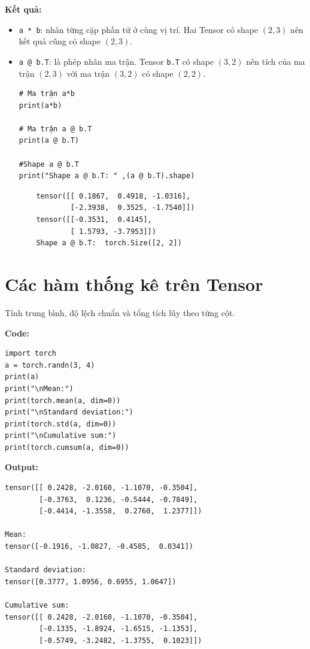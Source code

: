 \documentclass[12pt,a4paper]{article}
\begin{document}
\textbf{Kết quả:}
\begin{itemize}
    \item \texttt{a * b}: nhân từng cặp phần tử ở cùng vị trí. Hai Tensor có shape $(2,3)$ nên kết quả cũng có shape $(2,3)$.
    \item \texttt{a @ b.T}: là phép nhân ma trận. Tensor \texttt{b.T} có shape $(3,2)$ nên tích của ma trận $(2,3)$ với ma trận $(3,2)$ có shape $(2,2)$.

\begin{verbatim}
# Ma trận a*b
print(a*b)

# Ma trận a @ b.T
print(a @ b.T)

#Shape a @ b.T
print("Shape a @ b.T: " ,(a @ b.T).shape)
    \end{verbatim}

    \begin{verbatim}
    tensor([[ 0.1867,  0.4918, -1.0316],
            [-2.3938,  0.3525, -1.7540]])
    tensor([[-0.3531,  0.4145],
            [ 1.5793, -3.7953]])
    Shape a @ b.T:  torch.Size([2, 2])
    \end{verbatim}
\end{itemize}


    

\section{Các hàm thống kê trên Tensor}
Tính trung bình, độ lệch chuẩn và tổng tích lũy theo từng cột.

\textbf{Code:}
\begin{verbatim}
import torch
a = torch.randn(3, 4)
print(a)
print("\nMean:")
print(torch.mean(a, dim=0))
print("\nStandard deviation:")
print(torch.std(a, dim=0))
print("\nCumulative sum:")
print(torch.cumsum(a, dim=0))
\end{verbatim}

\textbf{Output:}
\begin{verbatim}
tensor([[ 0.2428, -2.0160, -1.1070, -0.3504],
        [-0.3763,  0.1236, -0.5444, -0.7849],
        [-0.4414, -1.3558,  0.2760,  1.2377]])

Mean:
tensor([-0.1916, -1.0827, -0.4585,  0.0341])

Standard deviation:
tensor([0.3777, 1.0956, 0.6955, 1.0647])

Cumulative sum:
tensor([[ 0.2428, -2.0160, -1.1070, -0.3504],
        [-0.1335, -1.8924, -1.6515, -1.1353],
        [-0.5749, -3.2482, -1.3755,  0.1023]])
\end{verbatim}
\end{document}
